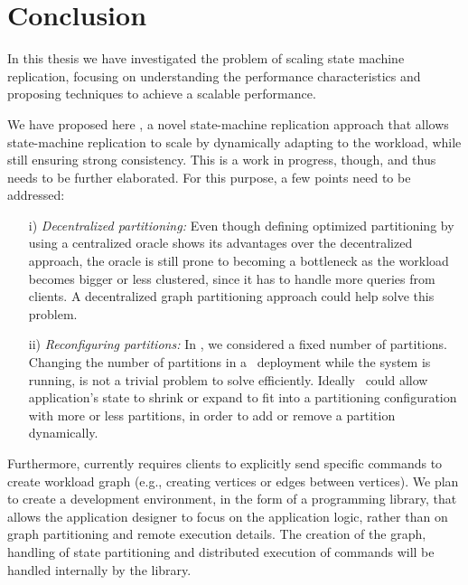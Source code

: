 \chapter[Conclusion]{Conclusion}

In this thesis we have investigated the problem of scaling state machine
replication, focusing on understanding the performance characteristics and
proposing techniques to achieve a scalable performance.


We have proposed here \dynastar, a novel state-machine replication approach that
allows state-machine replication to scale by dynamically adapting to the
workload, while still ensuring strong consistency. This is a work in progress,
though, and thus needs to be further elaborated. For this purpose, a few points
need to be addressed:

\begin{itemize}

    \item[i)]\emph{Decentralized partitioning:}
    Even though defining optimized partitioning by using a centralized oracle
    shows its advantages over the decentralized approach, the oracle is still
    prone to becoming a bottleneck as the workload becomes bigger or less
    clustered, since it has to handle more queries from clients. A decentralized
    graph partitioning approach could help solve this problem.

    \item[ii)]\emph{Reconfiguring partitions:}
    In \dynastar, we considered a fixed number of partitions. Changing the
    number of partitions in a \dynastar\ deployment while the system is running,
    is not a trivial problem to solve efficiently. Ideally \dynastar\ could
    allow application's state to shrink or expand to fit into a partitioning
    configuration with more or less partitions, in order to add or remove a
    partition dynamically.

\end{itemize}

Furthermore, \dynastar currently requires clients to explicitly send specific
commands to create workload graph (e.g., creating vertices or edges between
vertices). We plan to create a development environment, in the form of a
programming library, that allows the application designer to focus on the
application logic, rather than on graph partitioning and remote execution
details. The creation of the graph, handling of state partitioning and
distributed execution of commands will be handled internally by the library.
